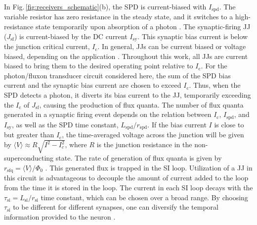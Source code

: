 \documentclass[twocolumn]{article}
\begin{document}
In Fig.\,\ref{fig:receivers_schematic}(b), the SPD is current-biased with $I_{\mathrm{spd}}$. The variable resistor has zero resistance in the steady state, and it switches to a high-resistance state temporarily upon absorption of a photon \cite{yake2007}. The synaptic-firing JJ ($J_{\mathrm{sf}}$) is current-biased by the DC current $I_{\mathrm{sy}}$. This synaptic bias current is below the junction critical current, $I_{\mathrm{c}}$. In general, JJs can be current biased or voltage biased, depending on the application \cite{vatu1998,ka1999}. Throughout this work, all JJs are current biased to bring them to the desired operating point relative to $I_{\mathrm{c}}$. For the photon/fluxon transducer circuit considered here, the sum of the SPD bias current and the synaptic bias current are chosen to exceed $I_{\mathrm{c}}$. Thus, when the SPD detects a photon, it diverts its bias current to the JJ, temporarily exceeding the $I_{\mathrm{c}}$ of $J_{\mathrm{sf}}$, causing the production of flux quanta. The number of flux quanta generated in a synaptic firing event depends on the relation between $I_{\mathrm{c}}$, $I_{\mathrm{spd}}$, and $I_{\mathrm{sy}}$, as well as the SPD time constant, $L_{\mathrm{spd}}/r_{\mathrm{spd}}$. If the bias current $I$ is close to but greater than $I_{\mathrm{c}}$, the time-averaged voltage across the junction will be given by $\langle V \rangle \approx R \sqrt{I^2-I_c^2}$, where $R$ is the junction resistance in the non-superconducting state. The rate of generation of flux quanta is given by $r_{\mathrm{sfq}} = \langle V \rangle/\Phi_0$ \cite{ka1999}. This generated flux is trapped in the SI loop. Utilization of a JJ in this circuit is advantageous to decouple the amount of current added to the loop from the time it is stored in the loop. The current in each SI loop decays with the $\tau_{\mathrm{si}} = L_{\mathrm{si}}/r_{\mathrm{si}}$ time constant, which can be chosen over a broad range. By choosing $\tau_{\mathrm{si}}$ to be different for different synapses, one can diversify the temporal information provided to the neuron \cite{stsa2000,abre2004,budr2004,be2007}.
\end{document}
